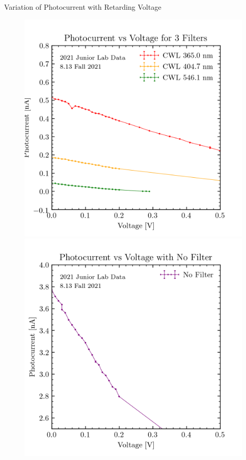 \documentclass[hyperref=pdftex, presentation]{beamer}
\begin{document}
\begin{frame}{Variation of Photocurrent with Retarding Voltage}
\begin{figure}
	\centering
	\begin{minipage}{0.45\textwidth}
		\centering
		\includegraphics[width=1.1\textwidth]{4_lenses_scatter.png} %
	\end{minipage}\vspace{0.55cm}
	\begin{minipage}{0.45\textwidth}
		\centering
		\includegraphics[width=1.1\textwidth]{nolens_scatter.png} %

\end{minipage}
\end{figure}
\end{frame}
\end{document}
